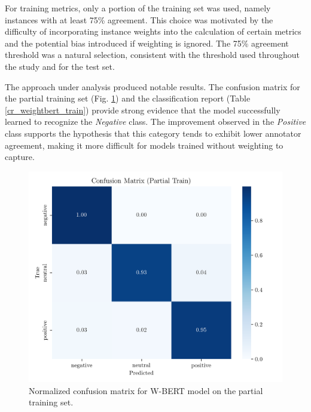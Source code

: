 \documentclass[conference]{IEEEtran}
\begin{document}
For training metrics, only a portion of the training set was used, namely instances with at least 75\% agreement. This choice was motivated by the difficulty of incorporating instance weights into the calculation of certain metrics and the potential bias introduced if weighting is ignored. The 75\% agreement threshold was a natural selection, consistent with the threshold used throughout the study and for the test set.

The approach under analysis produced notable results. The confusion matrix for the partial training set (Fig. \ref{fig:weighted_bert_confusion_matrix_Partial}) and the classification report (Table \ref{cr_weightbert_train}) provide strong evidence that the model successfully learned to recognize the \textit{Negative} class. The improvement observed in the \textit{Positive} class supports the hypothesis that this category tends to exhibit lower annotator agreement, making it more difficult for models trained without weighting to capture.

\begin{figure}[H]
    \centering
    \includegraphics[width=1\linewidth]{assets/weighted_bert_confusion_matrix_Partial Train.png}
    \caption{Normalized confusion matrix for W-BERT model on the partial training set.}
    \label{fig:weighted_bert_confusion_matrix_Partial}
\end{figure}
\end{document}
